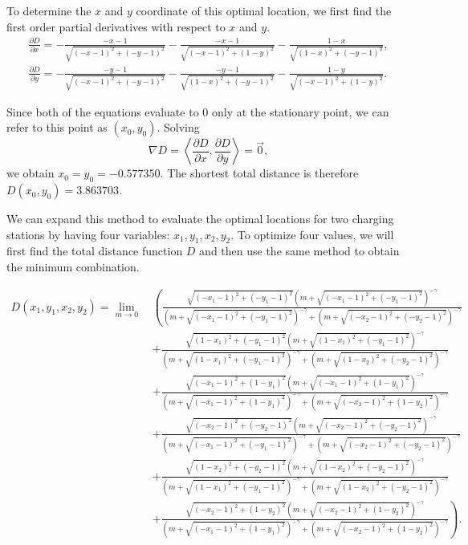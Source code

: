 \documentclass[10pt]{article}
\begin{document}
To determine the $x$ and $y$ coordinate of this optimal location, we first find the first order partial derivatives with respect to $x$ and $y$.
\begin{align}
\frac{\partial D}{\partial x} = -\frac{-x-1}{\sqrt{(-x-1)^2+(-y-1)^2}}-\frac{-x-1}{\sqrt{(-x-1)^2+(1-y)^2}}-\frac{1-x}{\sqrt{(1-x)^2+(-y-1)^2}},\\
\frac{\partial D}{\partial y} = -\frac{-y-1}{\sqrt{(-x-1)^2+(-y-1)^2}}-\frac{-y-1}{\sqrt{(1-x)^2+(-y-1)^2}}-\frac{1-y}{\sqrt{(-x-1)^2+(1-y)^2}}.
\end{align}

Since both of the equations evaluate to 0 only at the stationary point, we can refer to this point as $(x_0, y_0)$. Solving $$\nabla D= \left<\frac{\partial D}{\partial x}, \frac{\partial D}{\partial y}\right> = \vec{0},$$ we obtain $x_0 = y_0 = -0.577350.$ The shortest total distance is therefore $D(x_0,y_0) = 3.863703.$

We can expand this method to evaluate the optimal locations for two charging stations by having four variables: $x_1,y_1,x_2,y_2.$ To optimize four values, we will first find the total distance function $D$ and then use the same method to obtain the minimum combination.

\begin{align*}
	D(x_1,y_1,x_2,y_2) = \lim_{m\to 0} \, & \left(\frac{\sqrt{(-x_1-1)^2+(-y_1-1)^2} \left(m+\sqrt{(-x_1-1)^2+(-y_1-1)^2}\right)^{-\gamma }}{\left(m+\sqrt{(-x_1-1)^2+(-y_1-1)^2}\right)^{-\gamma}+ \left(m+\sqrt{(-x_2-1)^2+(-y_2-1)^2}\right)^{-\gamma }}\right.\\
	& + \left. \frac{\sqrt{(1-x_1)^2+(-y_1-1)^2} \left(m+\sqrt{(1-x_1)^2+(-y_1-1)^2}\right)^{-\gamma }}{\left(m+\sqrt{(1-x_1)^2+(-y_1-1)^2}\right)^{-\gamma } + \left(m+\sqrt{(1-x_2)^2+(-y_2-1)^2}\right)^{-\gamma }}\right. \\ 
	& + \left.\frac{\sqrt{(-x_1-1)^2+(1-y_1)^2} \left(m+\sqrt{(-x_1-1)^2+(1-y_1)^2}\right)^{-\gamma }}{\left(m+\sqrt{(-x_1-1)^2+(1-y_1)^2}\right)^{-\gamma }+\left(m+\sqrt{(-x_2-1)^2+(1-y_2)^2}\right)^{-\gamma }}\right. \\
	& + \left.\frac{\sqrt{(-x_2-1)^2+(-y_2-1)^2} \left(m+\sqrt{(-x_2-1)^2+(-y_2-1)^2}\right)^{-\gamma }}{\left(m+\sqrt{(-x_1-1)^2+(-y_1-1)^2}\right)^{-\gamma }+\left(m+\sqrt{(-x_2-1)^2+(-y_2-1)^2}\right)^{-\gamma }}\right. \\
	& + \left.\frac{\sqrt{(1-x_2)^2+(-y_2-1)^2} \left(m+\sqrt{(1-x_2)^2+(-y_2-1)^2}\right)^{-\gamma }}{\left(m+\sqrt{(1-x_1)^2+(-y_1-1)^2}\right)^{-\gamma }+\left(m+\sqrt{(1-x_2)^2+(-y_2-1)^2}\right)^{-\gamma }}\right.\\
	& + \left.\frac{\sqrt{(-x_2-1)^2+(1-y_2)^2} \left(m+\sqrt{(-x_2-1)^2+(1-y_2)^2}\right)^{-\gamma }}{\left(m+\sqrt{(-x_1-1)^2+(1-y_1)^2}\right)^{-\gamma }+\left(m+\sqrt{(-x_2-1)^2+(1-y_2)^2}\right)^{-\gamma }}\right).
\end{align*}
\end{document}
